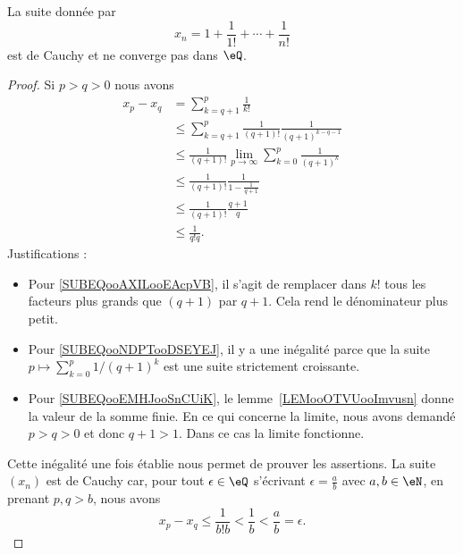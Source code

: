 \begin{proposition}
    La suite donnée par
    \begin{equation}
        x_n=1+\frac{ 1 }{ 1! }+\cdots +\frac{1}{ n! }
    \end{equation}
    est de Cauchy et ne converge pas dans \( \eQ\).
\end{proposition}

\begin{proof}
    Si \( p>q>0\) nous avons
    \begin{subequations}
        \begin{align}
            x_p-x_q&=\sum_{k=q+1}^p\frac{1}{ k! }\\
            &\leq \sum_{k=q+1}^p\frac{1}{ (q+1)! }\frac{1}{ (q+1)^{k-q-1} }  \label{SUBEQooAXILooEAcpVB}\\
            &\leq \frac{1}{ (q+1)! }\lim_{p\to \infty} \sum_{k=0}^{p}\frac{1}{ (q+1)^k }  \label{SUBEQooNDPTooDSEYEJ}\\
            &\leq \frac{1}{ (q+1)! }\frac{1}{ 1-\frac{1}{ q+1 } } \label{SUBEQooEMHJooSnCUiK}  \\
            &\leq \frac{1}{ (q+1)! }\frac{q+1}{q}\\
            &\leq \frac{1}{ q!q }.
        \end{align}
    \end{subequations}
    Justifications :
    \begin{itemize}
        \item Pour \eqref{SUBEQooAXILooEAcpVB}, il s'agit de remplacer dans \( k!\) tous les facteurs plus grands que \( (q+1)\) par \( q+1\). Cela rend le dénominateur plus petit.
        \item Pour \eqref{SUBEQooNDPTooDSEYEJ}, il y a une inégalité parce que la suite \( p\mapsto \sum_{k=0}^p1/(q+1)^k\) est une suite strictement croissante.

        \item Pour \eqref{SUBEQooEMHJooSnCUiK}, le lemme~\ref{LEMooOTVUooImvusn} donne la valeur de la somme finie. En ce qui concerne la limite, nous avons demandé \( p>q>0\) et donc \( q+1>1\). Dans ce cas la limite fonctionne.
    \end{itemize}

    Cette inégalité une fois établie nous permet de prouver les assertions. La suite \( (x_n) \) est de Cauchy car, pour tout \( \epsilon\in\eQ\) s'écrivant \( \epsilon=\frac{ a }{ b }\) avec \( a,b\in \eN\), en prenant \( p,q>b\), nous avons
    \begin{equation}
        x_p-x_q\leq \frac{1}{ b!b }<\frac{1}{ b }<\frac{ a }{ b }=\epsilon.
    \end{equation}


\end{proof}
